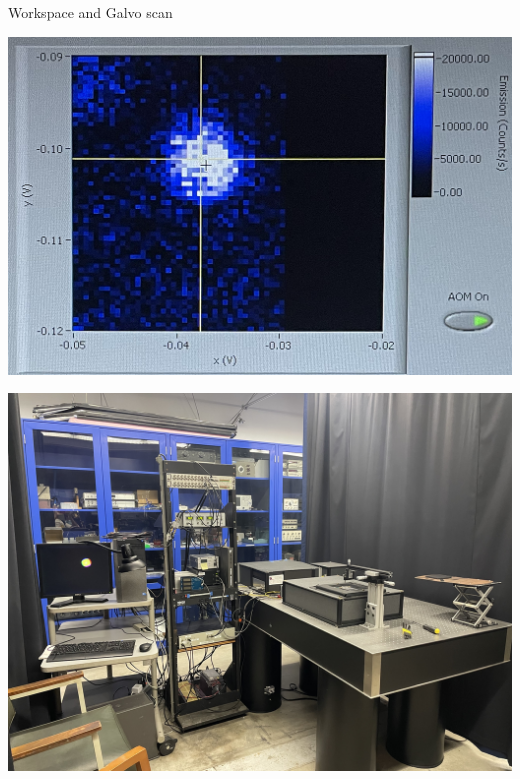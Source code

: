 \documentclass{beamer}
\begin{document}
\begin{frame}{Workspace and Galvo scan}

    \begin{minipage}{0.48\textwidth}
        \centering
        \includegraphics[width=\linewidth]{presentation/figs/galvo.png}
   
    \end{minipage}
    \hfill
    \begin{minipage}{0.48\textwidth}
        \centering
        \includegraphics[width=\linewidth]{presentation/figs/picture.jpg}
       
    \end{minipage}

\end{frame}

\end{document}
